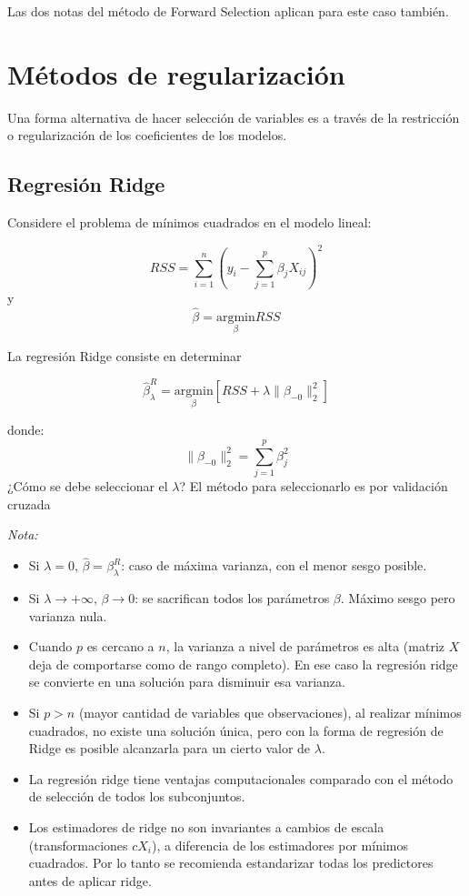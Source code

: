 \documentclass[
  12pt,
]{book}
\providecommand{\tightlist}{%
  \setlength{\itemsep}{0pt}\setlength{\parskip}{0pt}}
\theoremstyle{definition}
\theoremstyle{definition}
\theoremstyle{definition}
\theoremstyle{definition}
\theoremstyle{remark}
\begin{document}
Las dos notas del método de Forward Selection aplican para este caso también.

\hypertarget{muxe9todos-de-regularizaciuxf3n}{%
\section{Métodos de regularización}\label{muxe9todos-de-regularizaciuxf3n}}

Una forma alternativa de hacer selección de variables es a través de la restricción o regularización de los coeficientes de los modelos.

\hypertarget{regresiuxf3n-ridge}{%
\subsection{Regresión Ridge}\label{regresiuxf3n-ridge}}

Considere el problema de mínimos cuadrados en el modelo lineal:

\[ RSS = \sum_{i=1}^{n}\left(y_i-\sum_{j=1}^{p}\beta_jX_{ij}\right)^2 \]
y
\[
\hat\beta = \underset{\beta}{\mathrm{argmin}} RSS
\]

La regresión Ridge consiste en determinar

\[ \hat\beta^R_\lambda = \underset{\beta}{\mathrm{argmin}}\left[RSS + \lambda\|\beta_{-0}\|^2_2 \right]\]

donde:
\[\|\beta_{-0}\|^2_2 = \sum_{j=1}^{p}\beta_j^2\]
¿Cómo se debe seleccionar el \(\lambda\)?
El método para seleccionarlo es por validación cruzada

\emph{Nota:}

\begin{itemize}
\tightlist
\item
  Si \(\lambda = 0\), \(\hat\beta = \beta^R_\lambda\): caso de máxima varianza, con el menor sesgo posible.
\item
  Si \(\lambda \to +\infty\), \(\beta \to 0\): se sacrifican todos los parámetros \(\beta\). Máximo sesgo pero varianza nula.
\item
  Cuando \(p\) es cercano a \(n\), la varianza a nivel de parámetros es alta (matriz \(X\) deja de comportarse como de rango completo). En ese caso la regresión ridge se convierte en una solución para disminuir esa varianza.
\item
  Si \(p>n\) (mayor cantidad de variables que observaciones), al realizar mínimos cuadrados, no existe una solución única, pero con la forma de regresión de Ridge es posible alcanzarla para un cierto valor de \(\lambda\).
\item
  La regresión ridge tiene ventajas computacionales comparado con el método de selección de todos los subconjuntos.
\item
  Los estimadores de ridge no son invariantes a cambios de escala (transformaciones \(cX_i\)), a diferencia de los estimadores por mínimos cuadrados. Por lo tanto se recomienda estandarizar todas los predictores antes de aplicar ridge.
\end{itemize}
\end{document}

